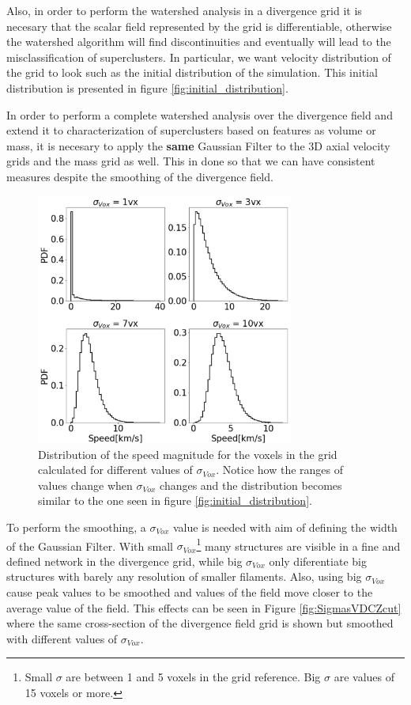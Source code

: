 \documentclass[usenatbib]{mnras}
\begin{document}
Also, in order to perform the watershed analysis in a divergence grid it is necesary that the scalar field represented by the grid is differentiable, otherwise the watershed algorithm will find discontinuities and eventually will lead to the misclassification of superclusters. In particular, we want velocity distribution of the grid to look such as the initial distribution of the simulation. This initial distribution is presented in figure \ref{fig:initial_distribution}.

In order to perform a complete watershed analysis over the divergence field and extend it to characterization of superclusters based on features as volume or mass,  it is necesary to apply the  \textbf{same} Gaussian Filter to the 3D axial velocity grids and the mass grid as well. This in done so that we can have consistent measures despite the smoothing of the divergence field.



\begin{figure}
    \centering
    \includegraphics[width=240pt]{smooth_vel_dist.pdf}
    \caption{Distribution of the speed magnitude for the voxels in the grid calculated for different values of $\sigma_{Vox}$. Notice how the ranges of values change when $\sigma_{Vox}$ changes and the distribution becomes similar to the one seen in figure \ref{fig:initial_distribution}.}
    \label{fig:MD_Varios}
\end{figure}

To perform the smoothing, a $\sigma_{Vox}$ value is needed with aim of defining the width of the Gaussian Filter. With small $\sigma_{Vox}$\footnote{Small $\sigma$ are between 1 and 5 voxels in the grid reference. Big $\sigma$ are values of 15 voxels or more.} many structures are visible in a fine and defined network in the divergence grid, while big $\sigma_{Vox}$ only diferentiate big structures with barely any resolution of smaller filaments. Also, using big $\sigma_{Vox}$ cause peak values to be smoothed and values of the field move closer to  the average value of the field. This effects can be seen in Figure \ref{fig:SigmasVDCZcut} where the same cross-section of the divergence field grid is shown but smoothed with different values of $\sigma_{Vox}$.
\end{document}
